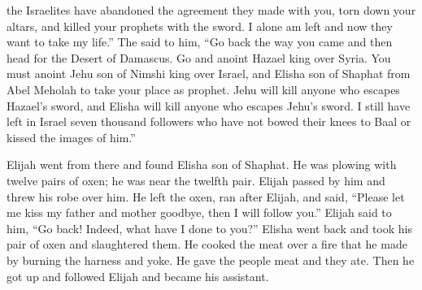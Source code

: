 {the Israelites
have abandoned
the agreement
they made with you, torn
down your altars,
and killed
your prophets
with the sword.
I alone
am
left
and now they want
to take
my life.”
The
{}
said
to
him, “Go
back
the way
you came
and then head for the Desert
of Damascus.
Go and anoint
Hazael
king
over
Syria.
You must anoint
Jehu
son
of Nimshi
king
over
Israel,
and Elisha
son
of Shaphat
from Abel Meholah
to take your place
as prophet.
Jehu
will kill
anyone who escapes
Hazael’s
sword,
and Elisha
will kill
anyone who escapes
Jehu’s
sword.
I still have left
in Israel
seven
thousand
followers who
have not
bowed their knees
to Baal
or
kissed
the images of him.”
\par }{\PP {}Elijah went
from there
and found
Elisha
son
of Shaphat.
He was
plowing
with twelve
pairs
of oxen; he
was near
the twelfth
pair. Elijah
passed
by
him and threw
his robe
over him.
He left
the
oxen,
ran
after
Elijah,
and said,
“Please
let me kiss
my father
and mother
goodbye, then
I will follow
you.” Elijah said
to him, “Go
back! Indeed,
what
have I done to you?”
Elisha went back
and took
his pair
of oxen
and slaughtered
them. He cooked
the meat
over a fire that he made by burning the harness and yoke. He gave
the people
meat and they ate.
Then he got
up and followed
Elijah
and became his assistant.

}
